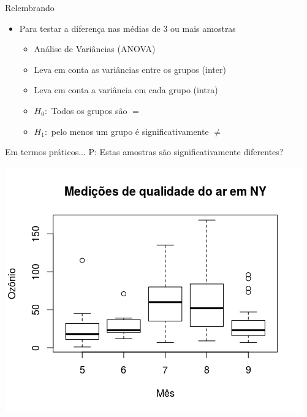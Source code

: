 \documentclass{beamer}
\begin{document}
\begin{frame}{Relembrando}
  \begin{itemize}
  \item Para testar a diferença nas médias de 3 ou mais amostras
    \begin{itemize}
    \item Análise de Variâncias (ANOVA)
      \bigskip
    \item Leva em conta as variâncias entre os grupos (\alert{inter})
    \item Leva em conta a variância em cada grupo (\alert{intra})
      \bigskip
    \item $H_0:$ Todos os grupos são $=$
      \bigskip
    \item $H_1:$ pelo menos um grupo é significativamente $\ne$
    \end{itemize}
  \end{itemize}
\end{frame}

\begin{frame}{Em termos práticos...}
P: Estas amostras são significativamente diferentes?

  \centering
  \includegraphics[height=.9\textheight]{Cap37-38/3samples-bp}
\end{frame}
\end{document}
